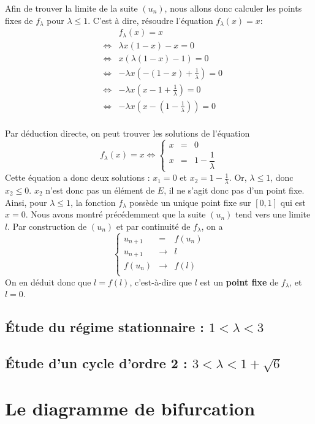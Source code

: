 Afin de trouver la limite de la suite $(u_n)$, nous allons donc calculer les points fixes de $f_\lambda$ pour $\lambda \leq 1$. C'est à dire, résoudre l'équation $f_\lambda(x) = x$:
\[
    \begin{array}{rcl}
        && f_\lambda(x) = x \\
        &\Longleftrightarrow& \lambda x(1-x)-x = 0 \\
        &\Longleftrightarrow& x(\lambda(1-x)-1) = 0 \\
        &\Longleftrightarrow& -\lambda x(-(1-x)+\frac{1}{\lambda}) = 0 \\
        &\Longleftrightarrow& -\lambda x(x-1+\frac{1}{\lambda}) = 0 \\
        &\Longleftrightarrow& -\lambda x(x-(1-\frac{1}{\lambda})) = 0 \\
    \end{array}
\]

Par déduction directe, on peut trouver les solutions de l'équation
$$
    f_\lambda(x) = x \Longleftrightarrow \left\{
            \begin{array}{rcl}
                    x &=& 0 \\
                    x &=& 1 - \dfrac{1}{\lambda}
            \end{array}
        \right.
$$
Cette équation a donc deux solutions : $x_1 = 0$ et $x_2 = 1 - \frac{1}{\lambda}$. Or, $\lambda \leq 1$, donc $x_2 \leq 0$. $x_2$ n'est donc pas un élément de $E$, il ne s'agit donc pas d'un point fixe. Ainsi, pour $\lambda \leq 1$, la fonction $f_\lambda$ possède un unique point fixe sur $[0,1]$ qui est $x = 0$. Nous avons montré précédemment que la suite $(u_n)$ tend vers une limite $l$. Par construction de $(u_n)$ et par continuité de $f_\lambda$, on a 
$$
    \left\{
        \begin{array}{rcl}
                u_{n+1} &=& f(u_n) \\
                u_{n+1} &\longrightarrow& l \\
                f(u_n)  &\longrightarrow& f(l) \\
        \end{array}
    \right.
$$
On en déduit donc que $\boxed{l = f(l)}$, c'est-à-dire que $l$ est un \textbf{point fixe} de $f_\lambda$, et $l=0$.

\subsection{\'Etude du régime stationnaire : \texorpdfstring{$1 < \lambda < 3$}{Lg}}
\subsection{\'Etude d'un cycle d'ordre 2 : \texorpdfstring{$3 < \lambda < 1+\sqrt{6}$}{Lg}}

\section{Le diagramme de bifurcation}